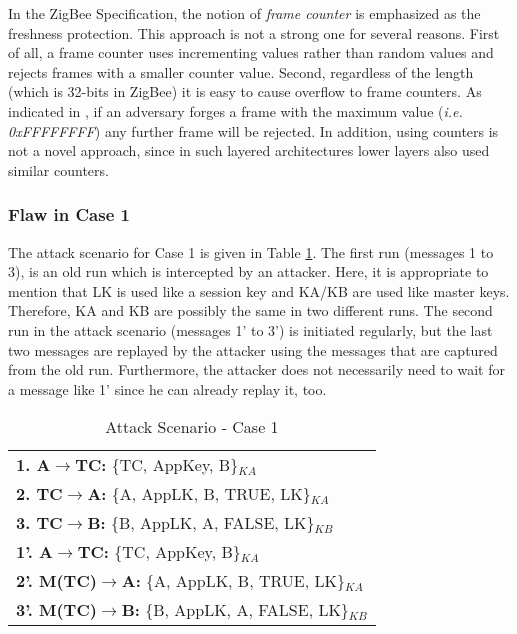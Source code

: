 In the ZigBee Specification, the notion of \emph{frame counter} is emphasized as the freshness protection. 
This approach is not a strong one for several reasons.
First of all, a frame counter uses incrementing values rather than random values and rejects frames with a smaller counter value.
Second, regardless of the length (which is 32-bits in ZigBee) it is easy to cause overflow to frame counters. As indicated in \cite{Sastry:Wagner}, if an adversary forges a frame with the maximum value (\emph{i.e. 0xFFFFFFFF}) any further frame will be rejected.
In addition, using counters is not a novel approach, since in such layered architectures lower layers also used similar counters.

\subsubsection{Flaw in Case 1}
The attack scenario for Case 1 is given in Table \ref{tab:att1}. The first run (messages 1 to 3), is an old run which is intercepted by an attacker. Here, it is appropriate to mention that LK is used like a session key and KA/KB are used like master keys. Therefore, KA and KB are possibly the same in two different runs. The second run in the attack scenario (messages 1' to 3') is initiated regularly, but the last two messages are replayed by the attacker using the messages that are captured from the old run.
Furthermore, the attacker does not necessarily need to wait for a message like 1' since he can already replay it, too.

\begin{table}\caption{Attack Scenario - Case 1}
\label{tab:att1}
\centering
\begin{tabular}{l}
\hline
\textbf{1. A\(\rightarrow\)TC:}      \{TC, AppKey, B\}$_{KA}$   \\
\textbf{2. TC\(\rightarrow\)A:}      \{A, AppLK, B, TRUE, LK\}$_{KA}$  \\
\textbf{3. TC\(\rightarrow\)B:}      \{B, AppLK, A, FALSE, LK\}$_{KB}$  \\
\hline
\textbf{1'. A\(\rightarrow\)TC:}     \{TC, AppKey, B\}$_{KA}$   \\
\textbf{2'. M(TC)\(\rightarrow\)A:}  \{A, AppLK, B, TRUE, LK\}$_{KA}$  \\
\textbf{3'. M(TC)\(\rightarrow\)B:}  \{B, AppLK, A, FALSE, LK\}$_{KB}$  \\
\hline
\end{tabular}
\end{table}

